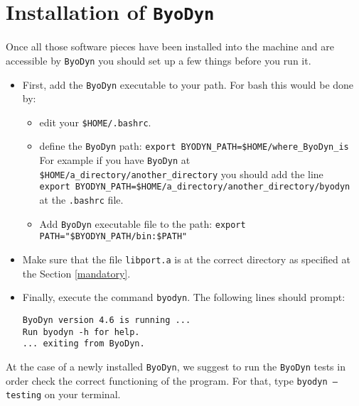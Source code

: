 \documentclass[a4paper, 11pt]{article}
\begin{document}
\section{Installation of \texttt{ByoDyn}}
Once all those software pieces have been installed into the machine and are accessible by \texttt{ByoDyn} you should set up a few things before you run it.
\begin{itemize}
\item
  First, add the \texttt{ByoDyn} executable to your path. 
  For bash this would be done by:
  \begin{itemize}
  \item
    edit your \texttt{\$HOME/.bashrc}.
  \item
    define the \texttt{ByoDyn} path: \texttt{export BYODYN\_PATH=\$HOME/where\_ByoDyn\_is}\\
    For example if you have \texttt{ByoDyn} at \texttt{\$HOME/a\_directory/another\_directory} you should add the line\\
    \texttt{export BYODYN\_PATH=\$HOME/a\_directory/another\_directory/byodyn}\\
    at the \texttt{.bashrc} file.
  \item
    Add \texttt{ByoDyn} executable file to the path: \texttt{export PATH="\$BYODYN\_PATH/bin:\$PATH"}
  \end{itemize}
\item
  Make sure that the file \texttt{libport.a} is at the correct directory as specified at the Section \ref{mandatory}.
\item
  Finally, execute the command \texttt{byodyn}.
  The following lines should prompt: \\
  \begin{footnotesize}
    \texttt{ByoDyn version 4.6 is running ...\\
      Run byodyn -h for help.\\
      ... exiting from ByoDyn.}
  \end{footnotesize}
\end{itemize}
At the case of a newly installed \texttt{ByoDyn}, we suggest to run the \texttt{ByoDyn} tests in order check the correct functioning of the program.
For that, type \texttt{byodyn --testing} on your terminal.
\end{document}
